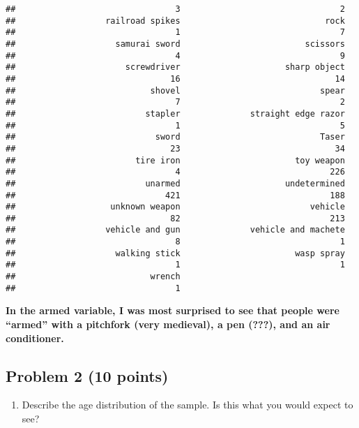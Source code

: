 \documentclass[
]{article}
\providecommand{\tightlist}{%
  \setlength{\itemsep}{0pt}\setlength{\parskip}{0pt}}
\begin{document}
\begin{verbatim}
##                                3                                2 
##                  railroad spikes                             rock 
##                                1                                7 
##                    samurai sword                         scissors 
##                                4                                9 
##                      screwdriver                     sharp object 
##                               16                               14 
##                           shovel                            spear 
##                                7                                2 
##                          stapler              straight edge razor 
##                                1                                5 
##                            sword                            Taser 
##                               23                               34 
##                        tire iron                       toy weapon 
##                                4                              226 
##                          unarmed                     undetermined 
##                              421                              188 
##                   unknown weapon                          vehicle 
##                               82                              213 
##                  vehicle and gun              vehicle and machete 
##                                8                                1 
##                    walking stick                       wasp spray 
##                                1                                1 
##                           wrench 
##                                1
\end{verbatim}

\textbf{In the armed variable, I was most surprised to see that people
were ``armed'' with a pitchfork (very medieval), a pen (???), and an air
conditioner.}

\hypertarget{problem-2-10-points}{%
\subsection{Problem 2 (10 points)}\label{problem-2-10-points}}

\begin{enumerate}
\def\labelenumi{\alph{enumi}.}
\tightlist
\item
  Describe the age distribution of the sample. Is this what you would
  expect to see?
\end{enumerate}
\end{document}
